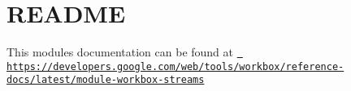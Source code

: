 \chapter{README}
\hypertarget{md_pkiclassroomrescheduler_2src_2main_2frontend_2node__modules_2workbox-streams_2_r_e_a_d_m_e}{}\label{md_pkiclassroomrescheduler_2src_2main_2frontend_2node__modules_2workbox-streams_2_r_e_a_d_m_e}
This module\textquotesingle{}s documentation can be found at \href{https://developers.google.com/web/tools/workbox/reference-docs/latest/module-workbox-streams}{\texttt{ https\+://developers.\+google.\+com/web/tools/workbox/reference-\/docs/latest/module-\/workbox-\/streams}} 